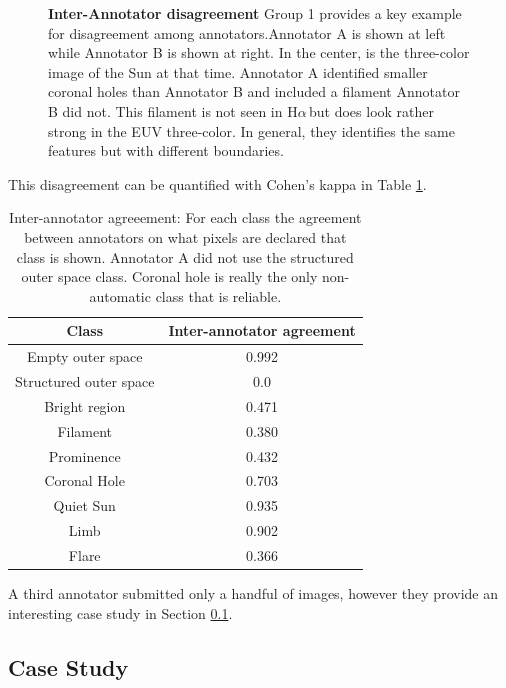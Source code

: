 \documentclass[twoside]{report}
\newcommand{\halpha}{H$\alpha$\,}
\begin{document}
\begin{figure}[ht]
\begin{center}
    \caption{{\bf Inter-Annotator disagreement} Group 1 provides a key example for disagreement among annotators.Annotator A is shown at left while Annotator B is shown at right. In the center, is the three-color image of the Sun at that time. Annotator A identified smaller coronal holes than Annotator B and included a filament Annotator B did not. This filament is not seen in \halpha but does look rather strong in the EUV three-color. In general, they identifies the same features but with different boundaries.} 
    \label{fig:annotatordifference}
 \end{center}
\end{figure}

This disagreement can be quantified with Cohen's kappa in Table \ref{tab:annotatoragreement}. 
\begin{table}[ht!]
\centering
 \begin{tabular}{|c c|} 
 \hline
 Class & Inter-annotator agreement\\
   \hline\hline
Empty outer space & 0.992 \\
Structured outer space & 0.0 \\
Bright region & 0.471\\
Filament & 0.380 \\
Prominence & 0.432 \\
Coronal Hole & 0.703 \\
Quiet Sun & 0.935 \\
Limb & 0.902 \\
Flare & 0.366 \\
 \hline
 \end{tabular}
 \caption{Inter-annotator agreeement: For each class the agreement between annotators on what pixels are declared that class is shown. Annotator A did not use the structured outer space class. Coronal hole is really the only non-automatic class that is reliable.}
 \label{tab:annotatoragreement}
\end{table}

A third annotator submitted only a handful of images, however they provide an interesting case study in Section \ref{sec:casestudy}.

\subsection{Case Study} \label{sec:casestudy}
    
\end{document}

